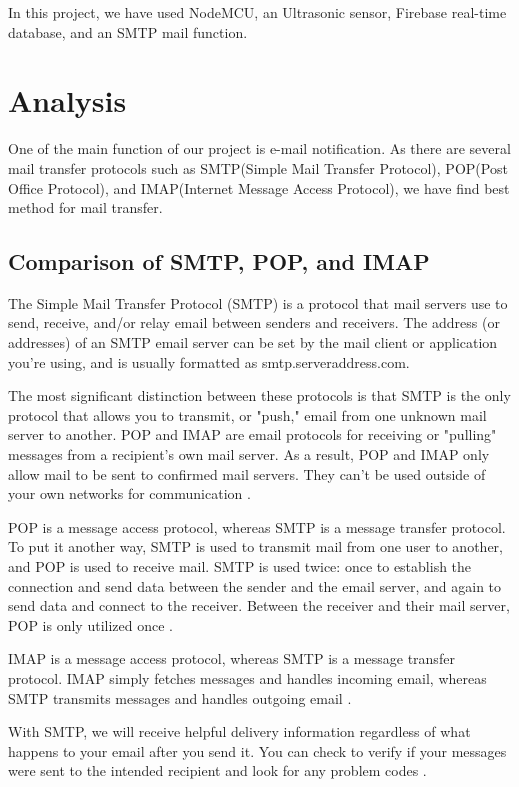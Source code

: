 \label{chapter:Methods and Materials}
In this project, we have used NodeMCU, an Ultrasonic sensor, Firebase real-time database, and an SMTP mail function.

\section{Analysis}
One of the main function of our project is e-mail notification. As there are several mail transfer protocols such as SMTP(Simple Mail Transfer Protocol), POP(Post Office Protocol), and IMAP(Internet Message Access Protocol), we have find best method for mail transfer. 

\subsection{Comparison of SMTP, POP, and IMAP}
The Simple Mail Transfer Protocol (SMTP) is a protocol that mail servers use to send, receive, and/or relay email between senders and receivers. The address (or addresses) of an SMTP email server can be set by the mail client or application you're using, and is usually formatted as smtp.serveraddress.com.

The most significant distinction between these protocols is that SMTP is the only protocol that allows you to transmit, or "push," email from one unknown mail server to another. POP and IMAP are email protocols for receiving or "pulling" messages from a recipient's own mail server. As a result, POP and IMAP only allow mail to be sent to confirmed mail servers. They can't be used outside of your own networks for communication \cite{Goud2020}.

POP is a message access protocol, whereas SMTP is a message transfer protocol. To put it another way, SMTP is used to transmit mail from one user to another, and POP is used to receive mail. SMTP is used twice: once to establish the connection and send data between the sender and the email server, and again to send data and connect to the receiver. Between the receiver and their mail server, POP is only utilized once \cite{Tzerefos1997}.

IMAP is a message access protocol, whereas SMTP is a message transfer protocol. IMAP simply fetches messages and handles incoming email, whereas SMTP transmits messages and handles outgoing email \cite{kara2019}.

With SMTP, we will receive helpful delivery information regardless of what happens to your email after you send it. You can check to verify if your messages were sent to the intended recipient and look for any problem codes \cite{Bettina2022}.

